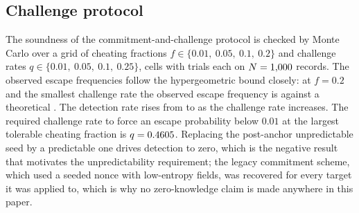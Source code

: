 \subsection*{Challenge protocol}

The soundness of the commitment-and-challenge protocol is checked by Monte Carlo
over a grid of cheating fractions $f\in\{0.01,\ 0.05,\ 0.1,\ 0.2\}$ and
challenge rates $q\in\{0.01,\ 0.05,\ 0.1,\ 0.25\}$, \ChallengeCells{} cells with \ChalTrials{} trials each on
$N=1{,}000$ records. The observed escape frequencies follow the hypergeometric
bound closely: at $f=0.2$ and the smallest challenge rate the observed escape
frequency is \ChalEscapeObs{} against a theoretical \ChalEscapeTheory{}. The
detection rate rises from \ChalDetLow{} to \ChalDetHigh{} as the challenge
rate increases. The required challenge rate to force an escape probability below $0.01$
at the largest tolerable cheating fraction is $q=0.4605$. Replacing the
post-anchor unpredictable seed by a predictable one drives detection to zero, which
is the negative result that motivates the unpredictability requirement; the legacy
commitment scheme, which used a seeded nonce with low-entropy fields, was recovered
for every target it was applied to, which is why no zero-knowledge claim is made
anywhere in this paper.
